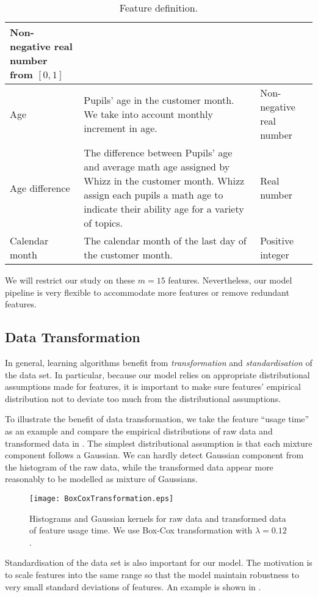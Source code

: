 \begin{table}[!h]
\begin{tabular}{p{3cm}|p{7cm}|p{3.3cm}}
Non-negative real number from $[0,1]$ \\
\hline
Age &
Pupils' age in the customer month. We take into account monthly increment in age.&
Non-negative real number \\
\hline
Age difference &
The difference between Pupils' age and average math age assigned by Whizz in the customer month. Whizz assign each pupils a math age to indicate their ability age for a variety of topics.&
Real number \\
\hline
Calendar month &
The calendar month of the last day of the customer month. &
Positive integer \\
\hline
\end{tabular}
\caption{Feature definition.}
\label{tab:featureDefinition}
\end{table}

We will restrict our study on these $m=15$ features. Nevertheless, our model pipeline is very flexible to accommodate more features or remove redundant features.

\subsection{Data Transformation}

In general, learning algorithms benefit from \textit{transformation} and \textit{standardisation} of the data set. In particular, because our model relies on appropriate distributional assumptions made for features, it is important to make sure features' empirical distribution not to deviate too much from the distributional assumptions.

To illustrate the benefit of data transformation, we take the feature ``usage time'' as an example and compare the empirical distributions of raw data and transformed data in . The simplest distributional assumption is that each mixture component follows a Gaussian. We can hardly detect Gaussian component from the histogram of the raw data, while the transformed data appear more reasonably to be modelled as mixture of Gaussians. 

\begin{figure}[!h]
\centering
\texttt{[image: BoxCoxTransformation.eps]}
\caption{Histograms and Gaussian kernels for raw data and transformed data of feature usage time. We use Box-Cox transformation with $\lambda=0.12$.}
\label{fig:boxcox}
\end{figure}

Standardisation of the data set is also important for our model. The motivation is to scale features into the same range so that the model maintain robustness to very small standard deviations of features. An example is shown in .

